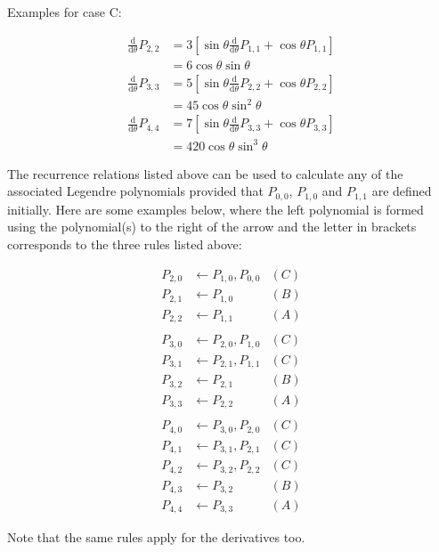 \documentclass[]{article}
\begin{document}
		Examples for case C:
		
		\begin{align}
			\frac{\text{d}}{\text{d}\theta}P_{2,2} &= 3 \left[\sin{\theta}\frac{\text{d}}{\text{d}\theta}P_{1,1} + \cos{\theta}P_{1,1}\right] \\
			&= 6 \cos{\theta}\sin{\theta} \\
			\frac{\text{d}}{\text{d}\theta}P_{3,3} &= 5 \left[\sin{\theta}\frac{\text{d}}{\text{d}\theta}P_{2,2} + \cos{\theta}P_{2,2}\right] \\
			&= 45\cos{\theta}\sin^2{\theta}\\
			\frac{\text{d}}{\text{d}\theta}P_{4,4} &= 7 \left[\sin{\theta}\frac{\text{d}}{\text{d}\theta}P_{3,3} + \cos{\theta}P_{3,3}\right] \\
			&= 420\cos{\theta}\sin^3{\theta}
		\end{align}
		
	
		The recurrence relations listed above can be used to calculate any of the associated Legendre polynomials provided that $P_{0,0}$, $P_{1,0}$ and $P_{1,1}$ are defined initially. Here are some examples below, where the left polynomial is formed using the polynomial(s) to the right of the arrow and the letter in brackets corresponds to the three rules listed above:
		
		\begin{align}
			P_{2,0} &\leftarrow P_{1,0},P_{0,0} &(C) \\
			P_{2,1} &\leftarrow P_{1,0}			&(B) \\
			P_{2,2} &\leftarrow P_{1,1}			&(A) \\
			\nonumber \\
			P_{3,0} &\leftarrow P_{2,0},P_{1,0} &(C) \\
			P_{3,1} &\leftarrow P_{2,1},P_{1,1} &(C) \\
			P_{3,2} &\leftarrow P_{2,1}			&(B) \\
			P_{3,3} &\leftarrow P_{2,2}			&(A) \\
			\nonumber \\
			P_{4,0} &\leftarrow P_{3,0},P_{2,0} &(C) \\
			P_{4,1} &\leftarrow P_{3,1},P_{2,1} &(C) \\
			P_{4,2} &\leftarrow P_{3,2},P_{2,2} &(C) \\
			P_{4,3} &\leftarrow P_{3,2}			&(B) \\
			P_{4,4} &\leftarrow P_{3,3}			&(A) 
		\end{align}
	
		Note that the same rules apply for the derivatives too.
		
\end{document}
